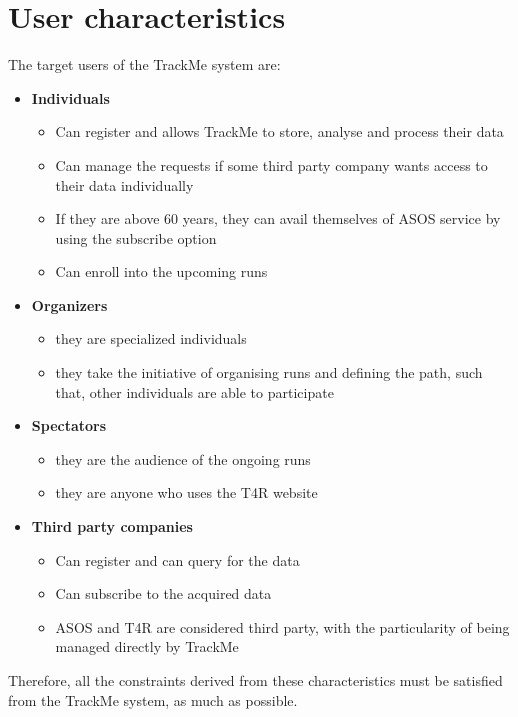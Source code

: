 \documentclass[hidelinks, 12pt]{report}
\begin{document}
	\section{User characteristics}
	The target users of the TrackMe system are:
	\begin{itemize}
		\item{} \textbf{Individuals}
		\begin{itemize}
			\item{} Can register and allows TrackMe to store, analyse and process their data
			\item{} Can manage the requests if some third party company wants access to their data individually
			\item{} If they are above 60 years, they can avail themselves of ASOS service by using the subscribe option
			\item{} Can enroll into the upcoming runs
		\end{itemize}
		\item{} \textbf{Organizers}
		\begin{itemize}
			\item{} they are specialized individuals
			\item{} they take the initiative of organising runs and defining the path, such that, other individuals are able to participate
			
			
		\end{itemize}
	\item{} \textbf{Spectators}
	\begin{itemize}
		\item they are the audience of the ongoing runs
		\item they are anyone who uses the T4R website
	\end{itemize}
		\item{} \textbf{Third party companies}
		\begin{itemize}
			\item{} Can register and can query for the data
			\item{} Can subscribe to the acquired data
			\item{} ASOS and T4R are considered third party, with the particularity of being managed directly by TrackMe
		\end{itemize}
	\end{itemize}
	
	Therefore, all the constraints derived from these characteristics must be satisfied from the TrackMe system, as much as possible.
	
\end{document}

